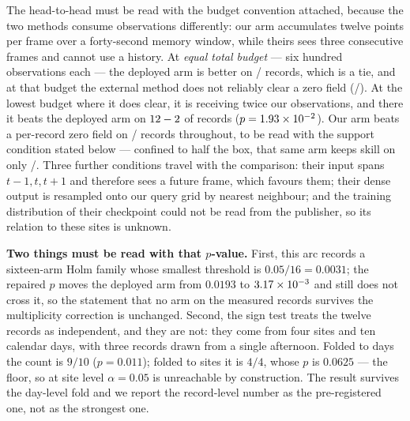\documentclass[review]{elsarticle}
\begin{document}
The head-to-head must be read with the budget convention attached, because the two
methods consume observations differently: our arm accumulates twelve points per frame
over a forty-second memory window, while theirs sees three consecutive frames and
cannot use a history. At \emph{equal total budget} --- six hundred observations each ---
the deployed arm is better on \EOneEqualShipWin{}/\EOneEqualN{} records, which is a tie,
and at that budget the external method does not reliably clear a zero field
(\EOneSelfTwoHundred{}/\EOneN{}). At the lowest budget where it does clear, it is
receiving twice our observations, and there it beats the deployed arm on
$12{}-2{}$ of \EOneN{} records ($p = 1.93\times 10^{-2}{}$). Our arm beats a
per-record zero field on \ROneBShipFixed{}/\ROneBN{} records throughout, to be read
with the support condition stated below --- confined to half the box, that same arm
keeps skill on only \REightSkillOut{}/\REightN{}. Three further conditions travel
with the comparison: their input spans $t-1,t,t+1$ and therefore sees a future frame,
which favours them; their dense output is resampled onto our query grid by nearest
neighbour; and the training distribution of their checkpoint could not be read from the
publisher, so its relation to these sites is unknown.

\textbf{Two things must be read with that $p$-value.} First, this arc records a
sixteen-arm Holm family whose smallest threshold is $0.05/16 = 0.0031$; the repaired
$p$ moves the deployed arm from $0.0193$ to $3.17\times 10^{-3}{}$ and still does not cross it, so
the statement that no arm on the measured records survives the multiplicity correction
is unchanged. Second, the sign test treats the twelve records as independent, and they
are not: they come from four sites and ten calendar days, with three records drawn from
a single afternoon. Folded to days the count is $9/10$ ($p = 0.011$); folded to sites it
is $4/4$, whose $p$ is $0.0625$ --- the floor, so at site level $\alpha = 0.05$ is
unreachable by construction. The result survives the day-level fold and we report the
record-level number as the pre-registered one, not as the strongest one.
\end{document}
